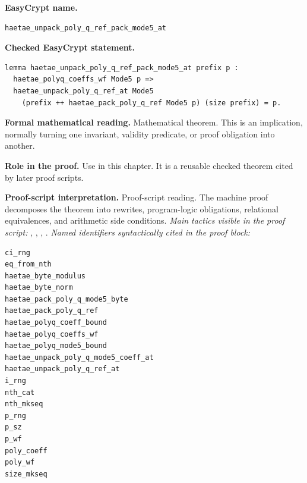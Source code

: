 \begin{formaltheorem}
\noindent\textbf{EasyCrypt name.}
\begin{lstlisting}[language=EasyCrypt,basicstyle=\ttfamily\scriptsize]
haetae_unpack_poly_q_ref_pack_mode5_at
\end{lstlisting}
\noindent\textbf{Checked EasyCrypt statement.}
\begin{lstlisting}[language=EasyCrypt,basicstyle=\ttfamily\scriptsize]
lemma haetae_unpack_poly_q_ref_pack_mode5_at prefix p :
  haetae_polyq_coeffs_wf Mode5 p =>
  haetae_unpack_poly_q_ref_at Mode5
    (prefix ++ haetae_pack_poly_q_ref Mode5 p) (size prefix) = p.
\end{lstlisting}
\noindent\textbf{Formal mathematical reading.}
Mathematical theorem. This is an implication, normally turning one invariant, validity predicate, or proof obligation into another.

\noindent\textbf{Role in the proof.}
Use in this chapter. It is a reusable checked theorem cited by later proof scripts.

\noindent\textbf{Proof-script interpretation.}
Proof-script reading. The machine proof decomposes the theorem into rewrites, program-logic obligations, relational equivalences, and arithmetic side conditions.
\emph{Main tactics visible in the proof script:} , , , .
\emph{Named identifiers syntactically cited in the proof block:}
\begin{lstlisting}[language=EasyCrypt,basicstyle=\ttfamily\scriptsize]
ci_rng
eq_from_nth
haetae_byte_modulus
haetae_byte_norm
haetae_pack_poly_q_mode5_byte
haetae_pack_poly_q_ref
haetae_polyq_coeff_bound
haetae_polyq_coeffs_wf
haetae_polyq_mode5_bound
haetae_unpack_poly_q_mode5_coeff_at
haetae_unpack_poly_q_ref_at
i_rng
nth_cat
nth_mkseq
p_rng
p_sz
p_wf
poly_coeff
poly_wf
size_mkseq
\end{lstlisting}

\end{formaltheorem}

